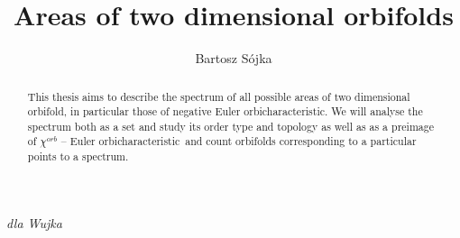 \documentclass[a4paper, 12pt]{report}
\title{Areas of two dimensional orbifolds}
\author{Bartosz Sójka}
\newcommand{\Eoc}{Euler orbicharacteristic}
\begin{document}

\newpage
\null
\thispagestyle{empty}

%
\newpage
\thispagestyle{empty}
\vspace*{19cm}
\hspace*{10cm}
\textit{dla Wujka}
\newpage
\null
\thispagestyle{empty}

\newpage
\tableofcontents
\begin{abstract}
\setcounter{page}{7}
This thesis aims to describe the spectrum of all possible areas of 
two dimensional orbifold, in particular those of negative \Eoc. 
We will analyse the spectrum both as a set and study its order type and topology 
as well as as a preimage of $\chi^{orb}$ -- \Eoc\ and count orbifolds corresponding 
to a particular points to a spectrum. 
\end{abstract}

%
%






%
%

%
%

\appendix
%

%
\end{document}
